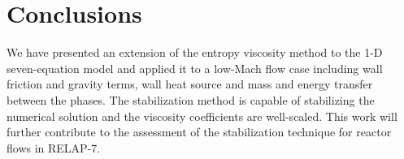 \documentclass{anstrans}
\begin{document}
\section{Conclusions}

We have presented an extension of the entropy viscosity method to the 1-D seven-equation model and applied it to a low-Mach flow case including wall friction and gravity terms, wall heat source and mass and energy transfer between the phases. The stabilization method is capable of stabilizing the numerical solution and the viscosity coefficients are well-scaled. This work will further contribute to the assessment of the stabilization technique for reactor flows in RELAP-7.





\end{document}
